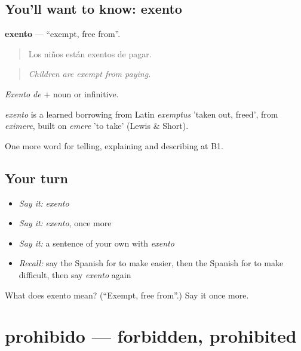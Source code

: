 \subsection*{You'll want to know: exento}
\textbf{exento} — \textquotedblleft{}exempt, free from\textquotedblright{}.

\begin{quote}
Los niños están exentos de pagar.
\end{quote}

\begin{quote}
\emph{Children are exempt from paying.}
\end{quote}

\emph{Exento de} + noun or infinitive.

\begin{cousinweb}
\emph{exento} is a learned borrowing from Latin \emph{exemptus} 'taken out, freed', from \emph{eximere}, built on \emph{emere} 'to take' (Lewis \& Short).
\end{cousinweb}

\begin{grammarlens}[title={What you've built}]
One more word for telling, explaining and describing at B1.
\end{grammarlens}

\subsection*{Your turn}
\begin{itemize}
\raggedright
  \item \emph{Say it:} \emph{exento}
  \item \emph{Say it:} \emph{exento}, once more
  \item \emph{Say it:} a sentence of your own with \emph{exento}
  \item \emph{Recall:} say the Spanish for to make easier, then the Spanish for to make difficult, then say \emph{exento} again
\end{itemize}

\begin{tcolorbox}[breakable,colback=teal!4,colframe=teal!35!black,title={Before you move on}]
What does exento mean? (\textquotedblleft{}Exempt, free from\textquotedblright{}.) Say it once more.
\end{tcolorbox}
\section[prohibido]{prohibido — forbidden, prohibited}

